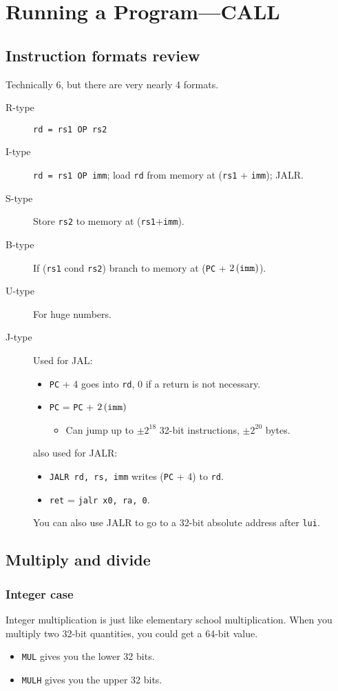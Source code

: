 \chapter{Running a Program—CALL}
\section{Instruction formats review}
Technically 6, but there are very nearly 4 formats.
\begin{description}
	\item[R-type] \verb|rd = rs1 OP rs2|
	\item[I-type] \verb|rd = rs1 OP imm|; load \texttt{rd} from memory at (\texttt{rs1} + \texttt{imm}); JALR.
	\item[S-type] Store \verb|rs2| to memory at (\texttt{rs1}+\texttt{imm}).
	\item[B-type] If (\texttt{rs1} cond \texttt{rs2}) branch to memory at (\texttt{PC} + \(2\left(\text{\texttt{imm}}\right)\)).
	\item[U-type] For huge numbers.
	\item[J-type] Used for JAL:
	\begin{itemize}
		\item \texttt{PC} + 4 goes into \texttt{rd}, 0 if a return is not necessary.
		\item \texttt{PC} = \texttt{{PC}} + \(2\left(\text{\texttt{imm}}\right)\)
			\begin{itemize}
				\item Can jump up to \(\pm2^{18}\) 32-bit instructions, \(\pm2^{20}\) bytes.
			\end{itemize}
	\end{itemize}
	also used for JALR:
	\begin{itemize}
		\item \texttt{JALR rd, rs, imm} writes (\texttt{PC} + 4) to \texttt{rd}.
		\item \texttt{ret} = \texttt{jalr x0, ra, 0}.
	\end{itemize}
	You can also use JALR to go to a 32-bit absolute address after \texttt{lui}.
\end{description}

\section{Multiply and divide}
\subsection{Integer case}
Integer multiplication is just like elementary school multiplication. When you multiply two 32-bit quantities, you could get a 64-bit value.
\begin{itemize}
	\item \texttt{MUL} gives you the lower 32 bits.
	\item \texttt{MULH} gives you the upper 32 bits.
\end{itemize}

